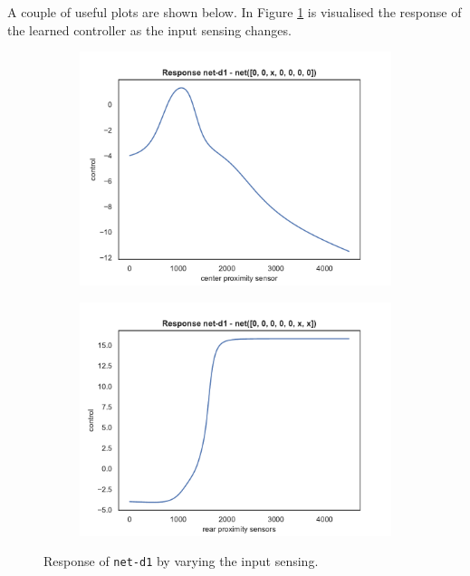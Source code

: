 A couple of useful plots are shown below. In Figure 
\ref{fig:net-d1responsesensors} is visualised the response of the learned 
controller as the input sensing changes. 
\begin{figure}[!htb]
	\centering
	\begin{subfigure}[h]{0.49\textwidth}
		\centering
		\includegraphics[width=\textwidth]{contents/images/net-d1/response-net-d1-front}%
	\end{subfigure}
	\hfill
	\begin{subfigure}[h]{0.49\textwidth}
		\centering
		\includegraphics[width=\textwidth]{contents/images/net-d1/response-net-d1-rear}
	\end{subfigure}
	\caption[Response of \texttt{net-d1} by varying the input sensing.]{Response of 
		\texttt{net-d1} by varying the input sensing.}
	\label{fig:net-d1responsesensors}
\end{figure}
